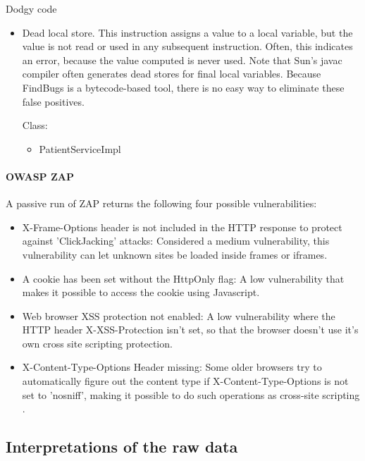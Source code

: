 \documentclass{article}
\begin{document}
Dodgy code
  \begin{itemize}
    \item Dead local store. This instruction assigns a value to a local variable, but the
      value is not read or used in any subsequent instruction. Often, this
      indicates an error, because the value computed is never used.
      Note that Sun's javac compiler often generates dead stores for final
      local variables. Because FindBugs is a bytecode-based tool, there is
      no easy way to eliminate these false positives.

      Class:
      \begin{itemize}

        \item PatientServiceImpl
      \end{itemize}
  \end{itemize}
\paragraph{OWASP ZAP}

A passive run of ZAP returns the following four possible vulnerabilities:

\begin{itemize}
 \item X-Frame-Options header is not included in the HTTP response to protect against
  'ClickJacking' attacks: Considered a medium vulnerability, this
  vulnerability can let unknown sites be loaded inside frames or iframes.
 \item A cookie has been set without the HttpOnly flag: A low vulnerability that
   makes it possible to access the cookie using Javascript. 
 \item Web browser XSS protection not enabled: A low vulnerability where the
   HTTP header X-XSS-Protection isn't set, so that the browser doesn't use it's
   own cross site scripting protection.
 \item X-Content-Type-Options Header missing: Some older browsers try to
   automatically figure out the content type if X-Content-Type-Options is not
   set to 'nosniff', making it possible to do such operations as cross-site
   scripting \autocite[]{XFrameOptions}.
\end{itemize}

\subsection{Interpretations of the raw data}
\end{document}
